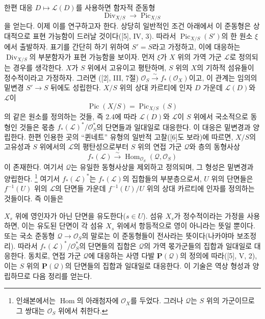 \documentclass[11pt,twoside,openany]{book}
\numberwithin{equation}{section}
\newcommand{\sourceunit}{front}
\newcommand{\src}[1]{%
  \phantomsection\hypertarget{src:\sourceunit:#1}{}%
  \marginpar{\raggedleft\footnotesize\sffamily #1}%
}
\theoremstyle{plain}
\theoremstyle{definition}
\theoremstyle{remark}
\begin{document}
한편 대응 $D\longmapsto\mathcal L(D)$를 사용하면 함자적 준동형
\begin{equation}
\operatorname{Div}_{X/S}\longrightarrow\operatorname{Pic}_{X/S}
\tag{+}
\end{equation}
을 얻는다. 이제 이를 연구하고자 한다. 상당히 일반적인 조건 아래에서 이
준동형은 상대적으로 표현 가능함이 드러날 것이다([5], IV, 3). 따라서
$\operatorname{Pic}_{X/S}(S')$의 한 원소 $\xi$에서 출발하자. 표기를
간단히 하기 위하여 $S'=S$라고 가정하고, 이에 대응하는
$\operatorname{Div}_{X/S}$의 부분함자가 표현 가능함을 보이자. 먼저
$\xi$가 $X$ 위의 가역 가군 $\mathcal L$로 정의되는 경우를 생각한다.
$X$가 $S$ 위에서 고유이고 평탄하며, $S$ 위의 $X$의 기하적 섬유들이
정수적이라고 가정하자. 그러면 ([2], III, 7절)
$\mathcal O_S\xrightarrow{\sim}f_*(\mathcal O_X)$이고, 이 관계는 임의의
밑변경 $S'\longrightarrow S$ 뒤에도 성립한다. $X/S$ 위의 상대 카르티에
인자 $D$ 가운데 $\mathcal L(D)$와 $\mathcal L$이
\[
\operatorname{Pic}(X/S)=\operatorname{Pic}_{X/S}(S)
\]
의 같은 원소를 정의하는 것들, 즉 2.4에 따라 $\mathcal L(D)$와
$\mathcal L$이 $S$ 위에서 국소적으로 동형인 것들은 몫층
$f_*(\mathcal L)^*/\mathcal O_S^*$의 단면들과 일대일로 대응한다. 이
대응은 밑변경과 양립한다. 한편 인용한 곳의 “퀸네트” 유형의 일반적
고찰([6]도 보라)에 따르면, $X/S$의 고유성과 $S$ 위에서의
$\mathcal L$의 평탄성으로부터 $S$ 위의 연접 가군 $\mathcal Q$와 층의
동형사상
\[
f_*(\mathcal L)\xrightarrow{\sim}
\operatorname{Hom}_{\mathcal O_S}(\mathcal Q,\mathcal O_S)
\]
이 존재한다. 여기서 $\mathcal Q$는 유일한 동형사상을 제외하고
정의되며, 그 형성은 밑변경과 양립한다.
\footnote{인쇄본에서는 $\operatorname{Hom}$의 아래첨자에
$\mathcal O_X$를 두었다. 그러나 $\mathcal Q$는 $S$ 위의 가군이므로
그 쌍대는 $\mathcal O_S$ 위에서 취한다.} 여기서
$f_*(\mathcal L)^*$는 $f_*(\mathcal L)$의 집합들의 부분층으로서, $U$
위의 단면들은 $f^{-1}(U)$ 위의 $\mathcal L$의 단면들 가운데
$f^{-1}(U)/U$ 위의 상대 카르티에 인자를 정의하는 것들이다. 즉 이들은

\src{153}
$X_s$ 위에 영인자가 아닌 단면을 유도한다($s\in U$). 섬유 $X_s$가
정수적이라는 가정을 사용하면, 이는 유도된 단면이 각 섬유 $X_s$ 위에서
항등적으로 영이 아니라는 뜻일 뿐이다. 또는 국소 준동형
$\mathcal Q\longrightarrow\mathcal O_S$의 말로는 이 준동형들이
전사라는 뜻이다(나카야마 보조정리). 따라서
$f_*(\mathcal L)^*/\mathcal O_S^*$의 단면들의 집합은 $\mathcal Q$의
가역 몫가군들의 집합과 일대일로 대응한다. 동치로, 연접 가군
$\mathcal Q$에 대응하는 사영 다발 $\mathbf P(\mathcal Q)$의 정의에
따라([5], V, 2), 이는 $S$ 위의 $\mathbf P(\mathcal Q)$의 단면들의
집합과 일대일로 대응한다. 이 기술은 역상 형성과 양립하므로 다음 정리를
얻는다.
\end{document}
